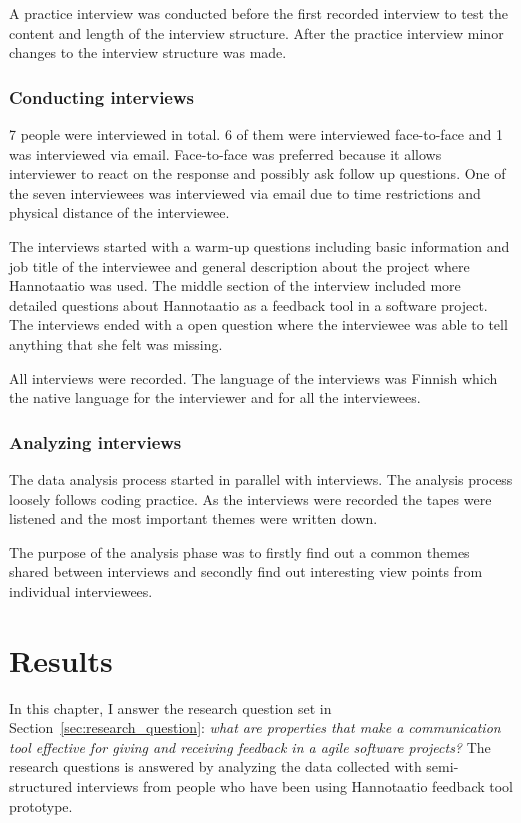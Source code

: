 \documentclass[english,12pt,a4paper,pdftex]{article}
\begin{document}
A practice interview was conducted before the first recorded interview to test the content and length of the interview structure. After the practice interview minor changes to the interview structure was made.

\subsubsection{Conducting interviews}

7 people were interviewed in total. 6 of them were interviewed face-to-face and 1 was interviewed via email. Face-to-face was preferred because it allows interviewer to react on the response and possibly ask follow up questions. One of the seven interviewees was interviewed via email due to time restrictions and physical distance of the interviewee.

The interviews started with a warm-up questions including basic information and job title of the interviewee and general description about the project where Hannotaatio was used. The middle section of the interview included more detailed questions about Hannotaatio as a feedback tool in a software project. The interviews ended with a open question where the interviewee was able to tell anything that she felt was missing.

All interviews were recorded. The language of the interviews was Finnish which the native language for the interviewer and for all the interviewees.

\subsubsection{Analyzing interviews}

The data analysis process started in parallel with interviews. The analysis process loosely follows coding practice. As the interviews were recorded the tapes were listened and the most important themes were written down. 

The purpose of the analysis phase was to firstly find out a common themes shared between interviews and secondly find out interesting view points from individual interviewees.

\clearpage

\section{Results}

In this chapter, I answer the research question set in Section~\ref{sec:research_question}: \textit{what are properties that make a communication tool effective for giving and receiving feedback in a agile software projects?} The research questions is answered by analyzing the data collected with semi-structured interviews from people who have been using Hannotaatio feedback tool prototype.
\end{document}
